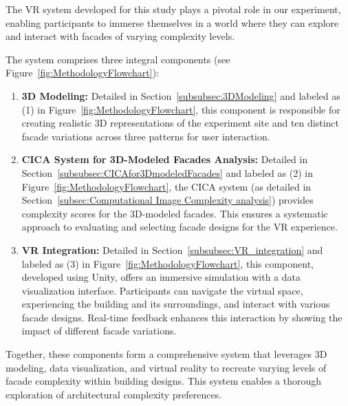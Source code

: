 The VR system developed for this study plays a pivotal role in our experiment, enabling participants to immerse themselves in a world where they can explore and interact with facades of varying complexity levels.

The system comprises three integral components (see Figure~\ref{fig:MethodologyFlowchart}):

\begin{enumerate}
\item \textbf{3D Modeling:} Detailed in Section~\ref{subsubsec:3DModeling} and labeled as (1) in Figure~\ref{fig:MethodologyFlowchart}, this component is responsible for creating realistic 3D representations of the experiment site and ten distinct facade variations across three patterns for user interaction.

\item \textbf{CICA System for 3D-Modeled Facades Analysis:} Detailed in Section~\ref{subsubsec:CICAfor3DmodeledFacades} and labeled as (2) in Figure~\ref{fig:MethodologyFlowchart}, the CICA system (as detailed in Section~\ref{subsec:Computational Image Complexity analysis}) provides complexity scores for the 3D-modeled facades.
This ensures a systematic approach to evaluating and selecting facade designs for the VR experience.

\item \textbf{VR Integration:} Detailed in Section~\ref{subsubsec:VR_integration} and labeled as (3) in Figure~\ref{fig:MethodologyFlowchart}, this component, developed using Unity, offers an immersive simulation with a data visualization interface.
Participants can navigate the virtual space, experiencing the building and its surroundings, and interact with various facade designs.
Real-time feedback enhances this interaction by showing the impact of different facade variations.
\end{enumerate}

Together, these components form a comprehensive system that leverages 3D modeling, data visualization, and virtual reality to recreate varying levels of facade complexity within building designs.
This system enables a thorough exploration of architectural complexity preferences.

